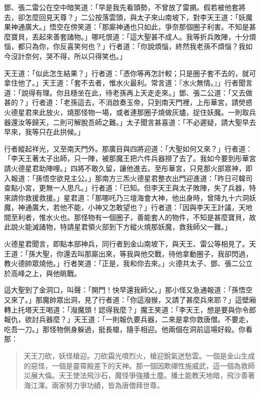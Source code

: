 鄧、張二雷公在空中暗笑道：「早是我先看頭勢，不曾放了雷㨝。假若被他套將去，卻怎麼回見天尊？」二公按落雲頭，與太子來山南坡下，對李天王道：「妖魔果神通廣大。」悟空在傍笑道：「那廝神通也只如此，爭奈那個圈子利害。不知是甚麼寶貝，丟起來善套諸物。」哪吒恨道：「這大聖甚不成人。我等折兵敗陣，十分煩惱，都只為你，你反喜笑何也？」行者道：「你說煩惱，終然我老孫不煩惱？我如今沒計奈何，哭不得，所以只得笑也。」

天王道：「似此怎生結果？」行者道：「憑你等再怎計較；只是圈子套不去的，就可拿住他了。」天王道：「套不去者，惟水火最利。常言道：『水火無情。』」行者聞言道：「說得有理。你且穩坐在此，待老孫再上天走走來。」鄧、張二公道：「又去做甚的？」行者道：「老孫這去，不消啟奏玉帝，只到南天門裡，上彤華宮，請熒惑火德星君來此放火，燒那怪物一場，或者連那圈子燒做灰燼，捉住妖魔。一則取兵器還汝等歸天，二則可解脫吾師之難。」太子聞言甚喜道：「不必遲疑，請大聖早去早來，我等只在此拱候。」

行者縱起祥光，又至南天門外。那廣目與四將迎道：「大聖如何又來？」行者道：「李天王著太子出師，只一陣，被那魔王把六件兵器撈了去了。我如今要到彤華宮請火德星君助陣哩。」四將不敢久留，讓他進去。至彤華宮，只見那火部眾神，即入報道：「孫悟空欲見主公。」那南方三炁火德星君整衣出門迎進道：「昨日可韓司查點小宮，更無一人思凡。」行者道：「已知。但李天王與太子敗陣，失了兵器，特來請你救援救援。」星君道：「那哪吒乃三壇海會大神，他出身時，曾降九十六洞妖魔，神通廣大，若他不能，小神又怎敢望也？」行者道：「因與李天王計議，天地間至利者，惟水火也。那怪物有一個圈子，善能套人的物件，不知是甚麼寶貝，故此說火能滅諸物，特請星君領火部到下方縱火燒那妖魔，救我師父一難。」

火德星君聞言，即點本部神兵，同行者到金山南坡下，與天王、雷公等相見了。天王道：「孫大聖，你還去叫那廝出來，等我與他交戰，待他拿動圈子，我卻閃過，教火德帥眾燒他。」行者笑道：「正是，我和你去來。」火德共太子、鄧、張二公立於高峰之上，與他眺戰。

這大聖到了金洞口，叫聲：「開門！快早還我師父。」那小怪又急通報道：「孫悟空又來了。」那魔帥眾出洞，見了行者道：「你這潑猴，又請了甚麼兵來耶？」這壁廂轉上托塔天王喝道：「潑魔頭！認得我麼？」魔王笑道：「李天王，想是要與你令郎報仇，欲討兵器麼？」天王道：「一則報仇要兵器，二來是拿你救唐僧。不要走，吃吾一刀。」那怪物側身躲過，挺長槍，隨手相迎。他兩個在洞前這場好殺。你看那：
\begin{quote}
天王刀砍，妖怪槍迎。刀砍霜光噴烈火，槍迎銳氣迸愁雲。一個是金山生成的惡怪，一個是靈霄殿差下的天神。那一個因欺禪性施威武，這一個為救師災展大倫。天王使法飛沙石，魔怪爭強播土塵。播土能教天地暗，飛沙善著海江渾。兩家努力爭功績，皆為唐僧拜世尊。
\end{quote}

